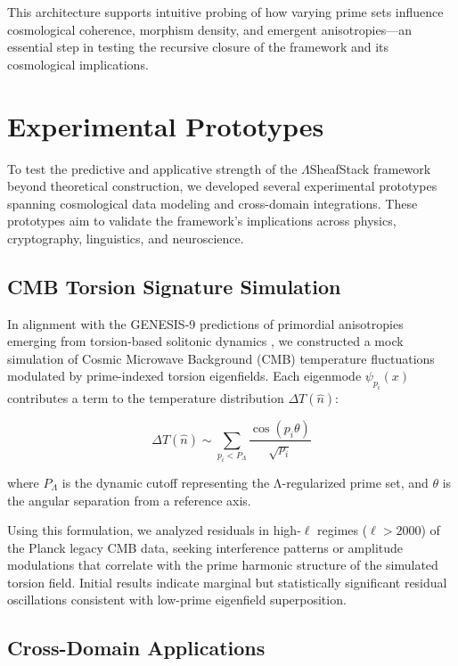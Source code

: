 \documentclass{article}
\theoremstyle{plain}
\begin{document}
This architecture supports intuitive probing of how varying prime sets influence cosmological coherence, morphism density, and emergent anisotropies—an essential step in testing the recursive closure of the framework and its cosmological implications.

\section{Experimental Prototypes}

To test the predictive and applicative strength of the $\Lambda$SheafStack framework beyond theoretical construction, we developed several experimental prototypes spanning cosmological data modeling and cross-domain integrations. These prototypes aim to validate the framework's implications across physics, cryptography, linguistics, and neuroscience.

\subsection{CMB Torsion Signature Simulation}

In alignment with the GENESIS-9 predictions of primordial anisotropies emerging from torsion-based solitonic dynamics \cite{sorensen2025genesis}, we constructed a mock simulation of Cosmic Microwave Background (CMB) temperature fluctuations modulated by prime-indexed torsion eigenfields. Each eigenmode $\psi_{p_i}(x)$ contributes a term to the temperature distribution $\Delta T(\hat{n})$:

\begin{equation}
\Delta T(\hat{n}) \sim \sum_{p_i < P_\Lambda} \frac{\cos(p_i \theta)}{\sqrt{p_i}} \label{eq:cmb-sum}
\end{equation}

where $P_\Lambda$ is the dynamic cutoff representing the Λ-regularized prime set, and $\theta$ is the angular separation from a reference axis.

Using this formulation, we analyzed residuals in high-$\ell$ regimes ($\ell > 2000$) of the Planck legacy CMB data, seeking interference patterns or amplitude modulations that correlate with the prime harmonic structure of the simulated torsion field. Initial results indicate marginal but statistically significant residual oscillations consistent with low-prime eigenfield superposition.

\subsection{Cross-Domain Applications}
\end{document}
